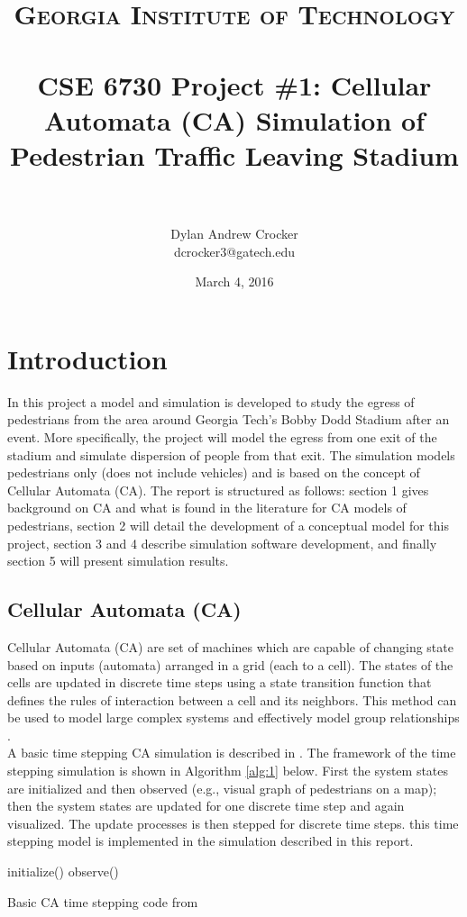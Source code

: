\documentclass[paper=a4, fontsize=11pt]{scrartcl}
\title{ 	
	\usefont{OT1}{bch}{b}{n}
	\normalfont \normalsize \textsc{Georgia Institute of Technology} \\ [25pt]
	\horrule{0.5pt} \\[0.4cm]
	\huge CSE 6730 Project \#1: Cellular Automata (CA) Simulation of Pedestrian Traffic Leaving Stadium \\
	\horrule{2pt} \\[0.5cm]
}
\author{
	Dylan Andrew Crocker\\
	dcrocker3@gatech.edu
}
\date{March 4, 2016}
\numberwithin{equation}{section}		%
\numberwithin{figure}{section}			%
\numberwithin{table}{section}		    %
\begin{document}
	\maketitle
	
	\section{Introduction}
	In this project a model and simulation is developed to study the egress of pedestrians from the 
	area around Georgia Tech's Bobby Dodd Stadium after an event. More specifically, the project 
	will model the egress from one exit of the stadium and simulate dispersion of people from that 
	exit. The simulation models pedestrians only (does not include vehicles) and is based on the 
	concept of Cellular Automata (CA). The report is structured as follows: section 1 gives 
	background on CA and what is found in the literature for CA models of pedestrians, section 2 
	will detail the development of a conceptual model for this project, section 3 and 4 describe 
	simulation software development, and finally section 5 will present simulation results. 
	
	\subsection{Cellular Automata (CA)}
	Cellular Automata (CA) are set of machines which are capable of changing state based on inputs 
	(automata) arranged in a grid (each to a cell)\cite{SayamaBook}. The states of the cells are 
	updated in discrete time steps using a state transition function that defines the rules of 
	interaction between a cell and its neighbors. This method can be used to model large complex 
	systems and effectively model group relationships \cite{SayamaBook}.\\
	
	\noindent
	A basic time stepping CA simulation is described in \cite{SayamaBook}. The framework of the 
	time stepping simulation is shown in Algorithm \ref{alg:1} below. First the system states are 
	initialized and then observed (e.g., visual graph of pedestrians on a map); then the system 
	states are updated for one discrete time step and again visualized. The update processes is 
	then stepped for discrete time steps. this time stepping model is implemented in the simulation 
	described in this report.
	
	\begin{algorithm}[h]
		initialize()\;
		observe()\;
	\caption{Basic CA time stepping code from \cite{SayamaBook} \label{alg:1}}
    \end{algorithm}
	
\end{document}

